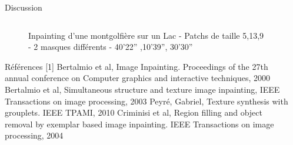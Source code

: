 \documentclass[final,hyperref={pdfpagelabels=false}]{beamer}
\begin{document}
\begin{frame}[t]
\begin{columns}[t]
\begin{column}{.930\textwidth}
\begin{block}{\Large Discussion}
\begin{columns}[t]
\begin{column}{.496\textwidth}
\begin{figure}[H]
\centering
{}
\caption{Inpainting d'une montgolfière sur un Lac - Patchs de taille 5,13,9 - 2 masques différents - 40'22'' ,10'39'', 30'30''  }
\end{figure}

\begin{block}{Références}
[1] Bertalmio et al, Image Inpainting. Proceedings of the 27th annual conference on Computer graphics and interactive techniques, 2000 \hfill \break 
[2] Bertalmio et al, Simultaneous structure and texture image inpainting, IEEE Transactions on image processing, 2003 \hfill \break
[3] Peyré, Gabriel, Texture synthesis with grouplets. IEEE TPAMI, 2010 \hfill \break
[4] Criminisi et al, Region filling and object removal by exemplar based image inpainting. IEEE Transactions on image processing, 2004 


\end{block}
\end{column}
\end{columns}
\end{block}
\end{column}
\begin{column}{.02\textwidth} \end{column}
\end{columns}

\end{frame}

\end{document}
